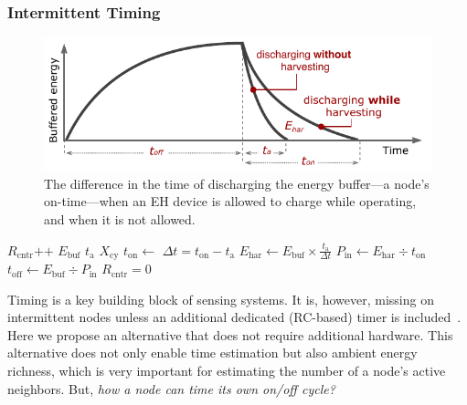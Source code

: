 \subsubsection{Intermittent Timing}
\label{subsec:interTimer}
%
\begin{figure}[t]
		\centering
		\includegraphics[width=\columnwidth]{figures/softwareClock}
		\caption{The difference in the time of discharging the energy buffer---a node's on-time---when an EH device is allowed to charge while operating, and when it is not allowed.}
		\label{fig:softwareClock}
\end{figure} 
\begin{algorithm}[t]
    \label{algo:offTime}
    \small
    \begin{algorithmic}[1]
		\State $R_\text{cntr}\text{++}$    \label{lin:i}
		\State $E_\text{buf}$ 
		\State $t_\text{a}$ \label{lin:ta}
		\State$ X_\text{cy} $  
			\State {}  \label{lin:fixedLoad}
			\State $t_\text{on} \leftarrow$  \label{lin:ton}
		\EndIf
			\State \label{lin:deltat}$\Delta{t} = t_\text{on}-t_\text{a}$   \label{lin:td}
			\State \label{lin:ehar}$E_\text{har} \leftarrow E_\text{buf}\times \frac{t_\text{a}}{\Delta{t}}$ 
			\State $P_\text{in} \leftarrow E_\text{har}\div{t_\text{on}}$  \label{lin:pin}
			\State \label{lin:offtime}$t_\text{off} \leftarrow E_\text{buf}\div P_\text{in}$ 
			\State $R_\text{cntr}=0$
		\EndIf
	\end{algorithmic}
\end{algorithm}
%
Timing is a key building block of sensing systems. It is, however, missing on intermittent nodes unless an additional dedicated (RC-based) timer is included~\cite{hester2017timely}. Here we propose an alternative that does not require additional hardware. This alternative does not only enable time estimation but also ambient energy richness, which is very important for estimating the number of a node's active neighbors. But, \textit{how a node can time its own on/off cycle?}

